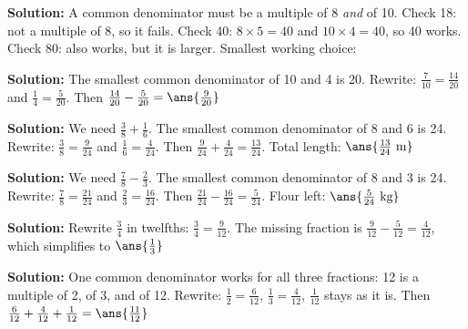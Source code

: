 \documentclass[12pt]{article}
\begin{document}

\textbf{Solution:} A common denominator must be a multiple of 8 \emph{and} of
10. Check 18: not a multiple of 8, so it fails. Check 40: $8 \times 5 = 40$
and $10 \times 4 = 40$, so 40 works. Check 80: also works, but it is larger.
Smallest working choice: 


\textbf{Solution:} The smallest common denominator of 10 and 4 is 20.
Rewrite: $\tfrac{7}{10} = \tfrac{14}{20}$ and $\tfrac{1}{4} = \tfrac{5}{20}$.
Then $\tfrac{14}{20} - \tfrac{5}{20} = \ans{\tfrac{9}{20}}$


\textbf{Solution:} We need $\tfrac{3}{8} + \tfrac{1}{6}$. The smallest common
denominator of 8 and 6 is 24.
Rewrite: $\tfrac{3}{8} = \tfrac{9}{24}$ and $\tfrac{1}{6} = \tfrac{4}{24}$.
Then $\tfrac{9}{24} + \tfrac{4}{24} = \tfrac{13}{24}$. Total length:
$\ans{\tfrac{13}{24}\ \text{m}}$


\textbf{Solution:} We need $\tfrac{7}{8} - \tfrac{2}{3}$. The smallest common
denominator of 8 and 3 is 24.
Rewrite: $\tfrac{7}{8} = \tfrac{21}{24}$ and $\tfrac{2}{3} = \tfrac{16}{24}$.
Then $\tfrac{21}{24} - \tfrac{16}{24} = \tfrac{5}{24}$. Flour left:
$\ans{\tfrac{5}{24}\ \text{kg}}$


\textbf{Solution:} Rewrite $\tfrac{3}{4}$ in twelfths: $\tfrac{3}{4} =
\tfrac{9}{12}$. The missing fraction is
$\tfrac{9}{12} - \tfrac{5}{12} = \tfrac{4}{12}$, which simplifies to
$\ans{\tfrac{1}{3}}$


\textbf{Solution:} One common denominator works for all three fractions:
12 is a multiple of 2, of 3, and of 12.
Rewrite: $\tfrac{1}{2} = \tfrac{6}{12}$, $\tfrac{1}{3} = \tfrac{4}{12}$,
$\tfrac{1}{12}$ stays as it is. Then
$\tfrac{6}{12} + \tfrac{4}{12} + \tfrac{1}{12} = \ans{\tfrac{11}{12}}$
\end{document}
